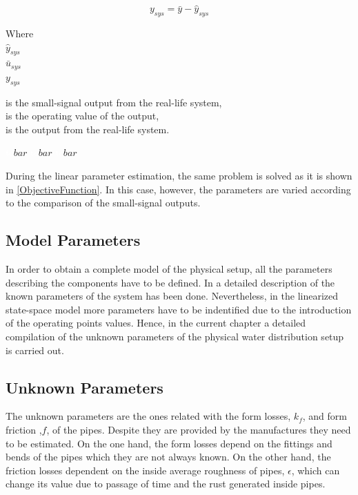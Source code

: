\begin{equation}
  y_{sys} = \bar{y} - \hat{y}_{sys} 
 \label{u_smallsignal}
\end{equation}

\begin{minipage}[t]{0.20\textwidth}
Where\\
\hspace*{8mm} $\hat{y}_{sys}$ \\
\hspace*{8mm} $\bar{u}_{sys}$ \\
\hspace*{8mm} $y_{sys}$ 
\end{minipage}
\begin{minipage}[t]{0.68\textwidth}
\vspace*{2mm}
is the small-signal output from the real-life system, \\
is the operating value of the output,\\
is the output from the real-life system. 
\end{minipage}
\begin{minipage}[t]{0.10\textwidth}
\vspace*{2mm}
\textcolor{White}{te}$\unit{bar}$
\textcolor{White}{te}$\unit{bar}$
\textcolor{White}{te}$\unit{bar}$
\end{minipage} 

During the linear parameter estimation, the same problem is solved as it is shown in \eqref{ObjectiveFunction}. In this case, however, the parameters are varied according to the comparison of the small-signal outputs.  

\subsection{Model Parameters}
\label{estimateParameters}
In order to obtain a complete model of the physical setup, all the parameters describing the components have to be defined. In  a detailed
description of the known parameters of the system has been done. Nevertheless, in the linearized state-space model more parameters have to be indentified
due to the introduction of the operating points values. Hence, in the current chapter a detailed compilation of the unknown parameters of the physical water distribution setup is carried out.


\subsection*{Unknown Parameters}
The unknown parameters are the ones related with the form losses, $k_f$, and form friction ,$f$, of the pipes. Despite they are 
provided by the manufactures they need to be estimated. On the one hand, the form losses depend on the fittings and bends of the pipes which they are not always known. 
On the other hand, the friction losses dependent on the inside average roughness of pipes, $\epsilon$, which can change its value due to passage of time 
and the rust generated inside pipes. 

